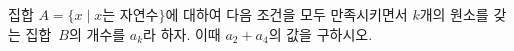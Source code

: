 집합 $A=\{x \mid x$는 자연수$\}$에 대하여 다음 조건을 모두 만족시키면서 $k$개의 원소를 갖는 집합~$B$의 개수를 $a_k$라 하자. 이때 $a_2+a_4$의 값을 구하시오.
